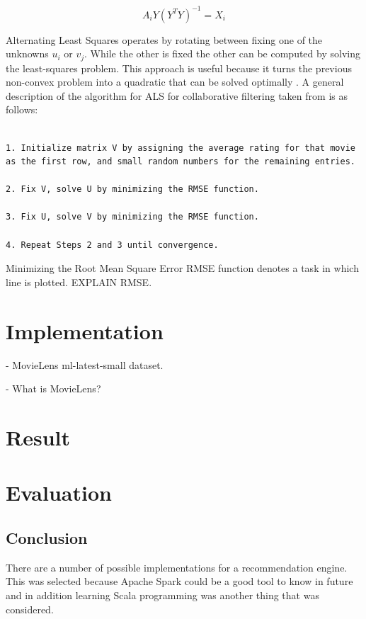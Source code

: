 \documentclass[12pt,a4paper,english
]{tutthesis}
\begin{document}
\begin{equation}
A_iY(Y^T Y)^{-1} = X_i
\end{equation}

Alternating Least Squares operates by rotating between fixing one of the unknowns $u_i$ or $v_j$. While the other is fixed the other can be computed by solving the least-squares problem. This approach is useful because it turns the previous non-convex problem into a quadratic that can be solved optimally \cite{aberger14}. A general description of the algorithm for ALS for collaborative filtering taken from \cite{aberger14} is as follows:

\begin{lstlisting}[caption=Alternating Least Squares algorithm \cite{aberger14}]

1. Initialize matrix V by assigning the average rating for that movie as the first row, and small random numbers for the remaining entries.

2. Fix V, solve U by minimizing the RMSE function.

3. Fix U, solve V by minimizing the RMSE function.

4. Repeat Steps 2 and 3 until convergence.

\end{lstlisting}

Minimizing the Root Mean Square Error RMSE function denotes a task in which line is plotted. EXPLAIN RMSE.

\chapter{Implementation}

- MovieLens ml-latest-small dataset.

- What is MovieLens?


\chapter{Result}

\chapter{Evaluation}
\label{ch:concl}

\section{Conclusion}

There are a number of possible implementations for a recommendation engine. This was selected because Apache Spark could be a good tool to know in future and in addition learning Scala programming was another thing that was considered.
\end{document}
